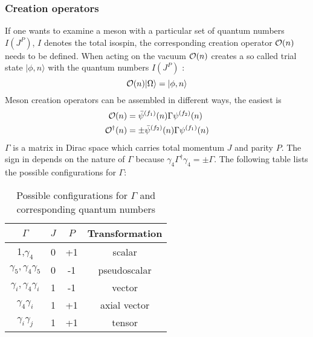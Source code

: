     \subsubsection{Creation operators}
        If one wants to examine a meson with a particular set of quantum numbers $I(J^P)$, $I$ denotes the total isospin, the corresponding creation operator $\mathcal{O}(n)$ needs to be defined. When acting on the vacuum $\mathcal{O}(n)$ creates a so called trial state $|\phi,n\rangle$ with the quantum numbers $I(J^P)$ \cite{introduction_to_lattice_hadron_spectroscopy}:
        \begin{equation}
            \mathcal{O}(n)|\Omega\rangle = |\phi,n\rangle
        \end{equation}
        Meson creation operators can be assembled in different ways, the easiest is
        \begin{equation}\label{meson_creation_operator}
            \begin{aligned}
                \mathcal{O}(n) &= \bar{\psi}^{(f_1)}(n)\Gamma\psi^{(f_2)}(n)\\
                \mathcal{O}^\dagger(n) &= \pm\bar{\psi}^{(f_2)}(n)\Gamma\psi^{(f_1)}(n)
            \end{aligned}
        \end{equation}
        $\Gamma$ is a matrix in Dirac space which carries total momentum $J$ and parity $P$. The sign in  depends on the nature of $\Gamma$ because $\gamma_4\Gamma^\dagger\gamma_4 = \pm \Gamma$. The following table lists the possible configurations for $\Gamma$:
        \begin{table}[h]
            \centering
            \begin{tabular}{|c|c|c|c|}
            \hline
            \multicolumn{1}{|c|}{$\Gamma$} & \multicolumn{1}{c|}{$J$} & \multicolumn{1}{c|}{$P$} & \multicolumn{1}{c|}{Transformation} \\ \hline
             1,$\gamma_4$ & 0 & +1 &    scalar           \\
             $\gamma_5, \gamma_4\gamma_5$ & 0 & -1 & pseudoscalar\\
             $\gamma_i,\gamma_4\gamma_i$ & 1 & -1 &  vector \\
             $\gamma_4\gamma_i$ & 1 & +1 & axial vector\\
              $\gamma_i\gamma_j$ & 1 & +1 & tensor \\
              \hline
            \end{tabular}
            \caption{Possible configurations for $\Gamma$ and corresponding quantum numbers}
            \label{my-label}
        \end{table}
